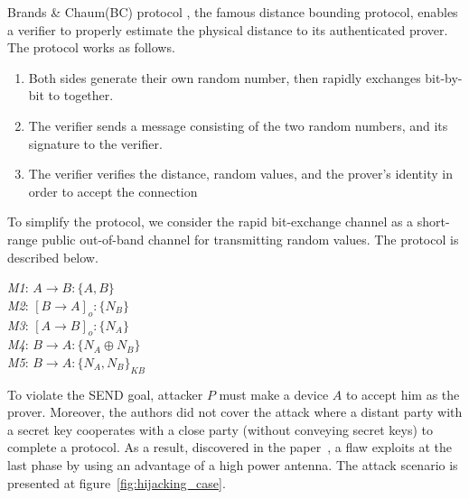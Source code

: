 Brands \& Chaum(BC) protocol \cite{Brands:1994aa}, the famous distance bounding protocol, enables a verifier to properly estimate the physical distance to its authenticated prover. The protocol works as follows.
\begin{enumerate}
\item Both sides generate their own random number, then rapidly exchanges bit-by-bit to together.
\item The verifier sends a message consisting of the two random numbers, and its signature to the verifier. 
\item The verifier verifies the distance, random values, and the prover's identity in order to accept the connection
\end{enumerate}

To simplify the protocol, we consider the rapid bit-exchange channel as a short-range public out-of-band channel for transmitting random values. The protocol is described below. 

\begin{center}
\begin{flushleft}
 \emph{M1}: $A \rightarrow B :\{A,B\}$ \\
\emph{M2}: $[B \rightarrow A]_o :\{N_B\}$ \\
\emph{M3}: $[A \rightarrow B]_o : \{N_A\}$\\
\emph{M4}: $B \rightarrow A :\{N_A \oplus N_B\}$ \\
\emph{M5}: $B \rightarrow A : \{N_A,N_B\}_{KB}$
\end{flushleft}
\end{center}

To violate the SEND goal, attacker $P$ must make a device $A$ to accept him as the prover. Moreover, the authors did not cover the attack where a distant party with a secret key cooperates with a close party (without conveying secret keys) to complete a protocol. As a result, discovered in the paper~\cite{6234408}, a flaw exploits at the last phase by using an advantage of a high power antenna. The attack scenario is presented at figure~\ref{fig:hijacking_case}. 

